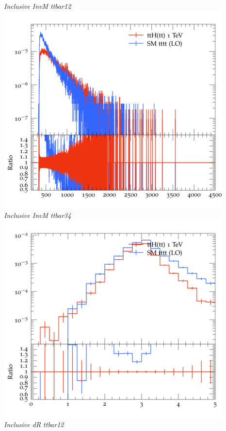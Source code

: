 \documentclass{beamer}
\begin{document}
\begin{frame}
\begin{columns}
\textit{\small Inclusive InvM ttbar12}
\includegraphics[width=\textwidth]{../plots/ttH_1000/tttt_ttH/Inclusive_InvM_ttbar34.png}\\
\textit{\small Inclusive InvM ttbar34}
\includegraphics[width=\textwidth]{../plots/ttH_1000/tttt_ttH/Inclusive_dR_ttbar12.png}\\
\textit{\small Inclusive dR ttbar12}
\end{columns}
\end{frame}
\end{document}
